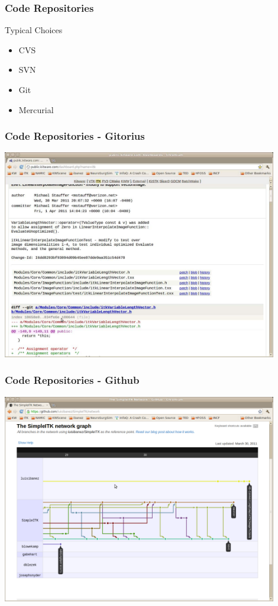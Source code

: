\documentclass[18pt]{beamer}
\begin{document}
\begin{frame}
\frametitle{Code Repositories}
\Huge
Typical Choices
\begin{itemize}
\item CVS
\pause
\item SVN
\pause
\item Git
\pause
\item Mercurial
\end{itemize}
\end{frame}


\begin{frame}
\frametitle{Code Repositories - Gitorius}
\includegraphics[width=0.9\textwidth,height=0.9\paperheight]{../Art/ITKGitScreenShot.jpg}
\end{frame}


\begin{frame}
\frametitle{Code Repositories - Github}
\includegraphics[width=0.9\textwidth,height=0.9\paperheight]{../Art/SimpleITKGithubScreenShot.jpg}
\end{frame}
\end{document}
